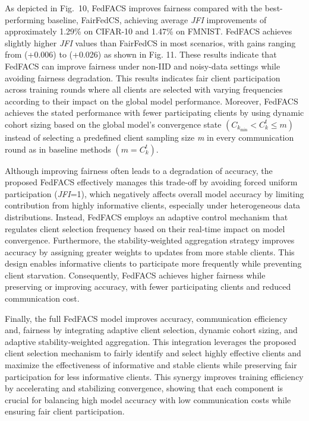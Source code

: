 \documentclass[pdflatex,sn-mathphys-num,oneside]{sn-jnl}%
\theoremstyle{thmstyleone}%
\theoremstyle{thmstyletwo}%
\theoremstyle{thmstylethree}%
\begin{document}
As depicted in Fig.~10, FedFACS improves fairness compared with the best-performing baseline, FairFedCS, achieving average \textit{JFI} improvements of approximately 1.29\% on CIFAR-10 and 1.47\% on FMNIST. FedFACS achieves slightly higher \textit{JFI} values than FairFedCS in most scenarios, with gains ranging from (+0.006) to (+0.026) as shown in Fig. 11. These results indicate that FedFACS can improve fairness under non-IID and noisy-data settings while avoiding fairness degradation. This results indicates fair client participation across training rounds where all clients are selected with varying frequencies according to their impact on the global model performance. Moreover, FedFACS achieves the stated performance with fewer participating clients by using dynamic cohort sizing based on the global model’s convergence state $(C_{k_{\min}} < C_k^t \le m)$ instead of selecting a predefined client sampling size \textit{m} in every communication round as in baseline methods $(m = C_k^t)$. 


Although improving fairness often leads to a degradation of accuracy, the proposed FedFACS effectively manages this trade-off by avoiding forced uniform participation (\textit{JFI}=1), which negatively affects overall model accuracy by limiting contribution from highly informative clients, especially under heterogeneous data distributions. Instead, FedFACS employs an adaptive control mechanism that regulates client selection frequency based on their real-time impact on model convergence. Furthermore, the stability-weighted aggregation strategy improves accuracy by assigning greater weights to updates from more stable clients. This design enables informative clients to participate more frequently while preventing client starvation. Consequently, FedFACS achieves higher fairness while preserving or improving accuracy, with fewer participating clients and reduced communication cost.


Finally, the full FedFACS model improves accuracy, communication efficiency and, fairness by integrating adaptive client selection, dynamic cohort sizing, and adaptive stability-weighted aggregation. This integration leverages the proposed client selection mechanism to fairly identify and select highly effective clients and maximize the effectiveness of informative and stable clients while preserving fair participation for less informative clients. This synergy improves training efficiency by accelerating and stabilizing convergence, showing that each component is crucial for balancing high model accuracy with low communication costs while ensuring fair client participation.
\end{document}
